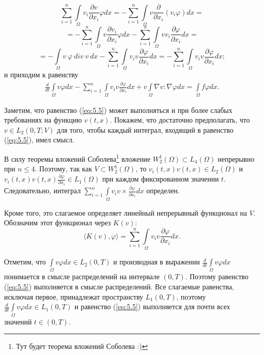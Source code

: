 $$\sum_{i=1}^{n}\int\limits_\Omega v_i\frac{\partial v}{\partial x_i}\varphi dx=-\sum_{i=1}^{n}\int\limits_\Omega v\frac{\partial}{\partial x_i}(v_i\varphi)dx=$$
$$=-\sum_{i=1}^{n}\int\limits_\Omega v\frac{\partial v_i}{\partial x_i}\varphi dx-\sum_{i=1}^{n}\int\limits_\Omega vv_i\frac{\partial\varphi}{\partial x_i} dx=$$
$$=-\int\limits_\Omega v \ \varphi \ div \ v \ dx-\sum_{i=1}^{n}\int\limits_\Omega v_i v\frac{\partial\varphi}{\partial x_i}dx=
-\sum_{i=1}^{n}\int\limits_\Omega v_i v\frac{\partial\varphi}{\partial x_i}dx;$$
и приходим к равенству
\begin{equation}\label{eq:5.5}
    \begin{gathered}
        \frac{d}{dt}\int\limits_\Omega v \varphi dx-\sum_{i=1}^{n}\int\limits_\Omega v_i v
        \frac{\partial \varphi }{\partial x_i}dx + v\int\limits_\Omega \nabla v :\nabla\varphi dx
        =\int\limits_\Omega f\varphi dx.
    \end{gathered}
\end{equation}

Заметим, что равенство (\ref{eq:5.5}) может выполняться и при более слабых требованиях на функцию $v(t, x)$.
Покажем, что достаточно предполагать, что $v\in L_2(0, T;V)$ для того, чтобы каждый интеграл, входящий в равенство (\ref{eq:5.5}), имел смысл.

В силу теоремы вложений Соболева\footnote{Тут будет теорема вложений Соболева :)} вложение $W^{1}_{2}(\Omega)\subset L_4(\Omega)$ непрерывно при $n \leqslant 4$.
Поэтому, так как $V\subset W^{1}_{2}(\Omega)$, то $v_i(t, x)v(t, x)\in L_2(\Omega)$ и $v_i(t, x)v(t, x)\frac{\partial \varphi }{\partial x_i} \in L_1(\Omega)$
при каждом фиксированном значении $t$. Следовательно, интеграл $\sum\limits_{i=1}^{n}\int\limits_\Omega v_iv\times\frac{\partial\varphi}{\partial x_i}dx$ определен.

Кроме того, это слагаемое определяет линейный непрерывный функционал на $V$. Обозначим этот функционал через $K(v)$:
$$\langle K(v),\varphi \rangle = \sum_{i=1}^{n}\int\limits_\Omega v_i v \frac{\partial \varphi}{\partial x_i}dx.$$

Отметим, что $\int\limits_\Omega v \varphi dx\in L_2(0, T)$ и производная в выражении \linebreak
$\frac{d}{dt}\int\limits_\Omega v \varphi dx$
понимается в смысле распределений на интервале $(0, T)$. Поэтому равенство (\ref{eq:5.5}) выполняется в смысле распределений.
Все слагаемые равенства, исключая первое, принадлежат пространству $L_1(0, T)$, поэтому $\frac{d}{dt}\int\limits_\Omega v \varphi dx\in L_1(0, T)$
и равенство (\ref{eq:5.5}) выполняется для почти всех значений $t\in (0, T)$.

